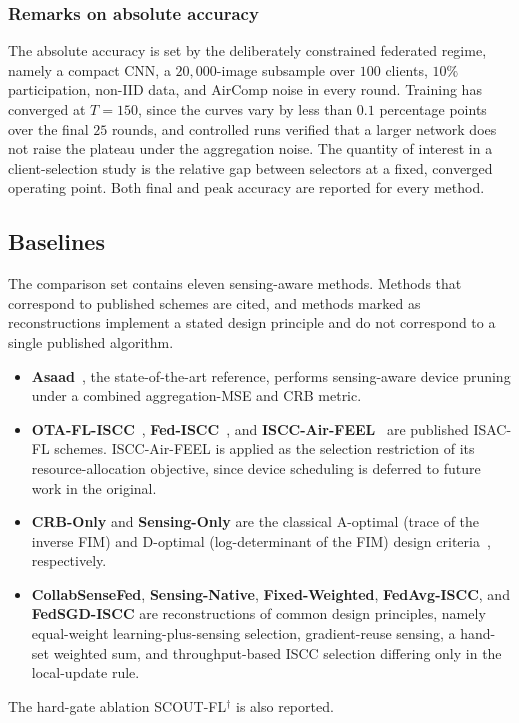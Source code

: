 \documentclass[lettersize,journal]{IEEEtran}
\newcommand{\scout}{SCOUT-FL}
\begin{document}
\subsubsection*{Remarks on absolute accuracy}
The absolute accuracy is set by the deliberately constrained federated regime, namely a compact CNN, a $20{,}000$-image subsample over $100$ clients, $10\%$ participation, non-IID data, and AirComp noise in every round. Training has converged at $T=150$, since the curves vary by less than $0.1$ percentage points over the final $25$ rounds, and controlled runs verified that a larger network does not raise the plateau under the aggregation noise. The quantity of interest in a client-selection study is the relative gap between selectors at a fixed, converged operating point. Both final and peak accuracy are reported for every method.

\subsection{Baselines}
The comparison set contains eleven sensing-aware methods. Methods that correspond to published schemes are cited, and methods marked as reconstructions implement a stated design principle and do not correspond to a single published algorithm.
\begin{itemize}
\item \textbf{Asaad}~\cite{asaad2025}, the state-of-the-art reference, performs sensing-aware device pruning under a combined aggregation-MSE and CRB metric.
\item \textbf{OTA-FL-ISCC}~\cite{zheng2024otafliscc}, \textbf{Fed-ISCC}~\cite{du2024fediscc}, and \textbf{ISCC-Air-FEEL}~\cite{wen2025isccairfeel} are published ISAC-FL schemes. ISCC-Air-FEEL is applied as the selection restriction of its resource-allocation objective, since device scheduling is deferred to future work in the original.
\item \textbf{CRB-Only} and \textbf{Sensing-Only} are the classical A-optimal (trace of the inverse FIM) and D-optimal (log-determinant of the FIM) design criteria~\cite{kay1993,krause2014submodular}, respectively.
\item \textbf{CollabSenseFed}, \textbf{Sensing-Native}, \textbf{Fixed-Weighted}, \textbf{FedAvg-ISCC}, and \textbf{FedSGD-ISCC} are reconstructions of common design principles, namely equal-weight learning-plus-sensing selection, gradient-reuse sensing, a hand-set weighted sum, and throughput-based ISCC selection differing only in the local-update rule.
\end{itemize}
The hard-gate ablation \scout{}$^{\dagger}$ is also reported.
\end{document}
